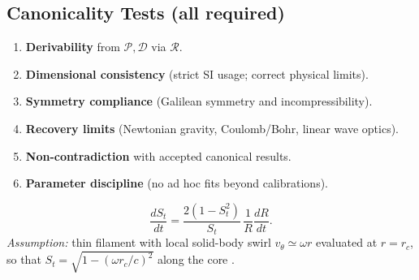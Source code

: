 \documentclass[reprint,aps,onecolumn,nofootinbib]{revtex4-2}
\begin{document}
    \subsection*{Canonicality Tests (all required)}
    \begin{enumerate}
    \item \textbf{Derivability} from $\mathcal{P},\mathcal{D}$ via $\mathcal{R}$.
    \item \textbf{Dimensional consistency} (strict SI usage; correct physical limits).
    \item \textbf{Symmetry compliance} (Galilean symmetry and incompressibility).
    \item \textbf{Recovery limits} (Newtonian gravity, Coulomb/Bohr, linear wave optics).
    \item \textbf{Non-contradiction} with accepted canonical results.
    \item \textbf{Parameter discipline} (no ad hoc fits beyond calibrations).
    \end{enumerate}
    \begin{tcolorbox}[title=Corollary: Clock--Radius Transport]
    \[
        \frac{dS_t}{dt}=\frac{2(1-S_t^2)}{S_t}\,\frac{1}{R}\frac{dR}{dt}.
    \]
    \textit{Assumption:} thin filament with local solid-body swirl $v_\theta\simeq \omega r$ evaluated at $r=r_c$, so that
    $S_t=\sqrt{1-(\omega r_c/c)^2}$ along the core \cite{Batchelor1967,Saffman1992}. %
    \end{tcolorbox}
\end{document}
